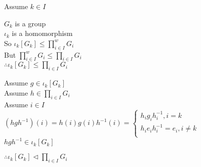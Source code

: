 \documentclass[letterpaper,12pt,fleqn]{article}
\newcommand{\direct}{\prod_{i\in I}G_i}
\newcommand{\iweak}{\prod_{i\in I}^wG_i}
\renewcommand{\i}{\iota}
\newcommand{\n}{\triangleleft}
\begin{document}
\begin{theproof}
  Assume $k\in I$
  
  $G_k$ is a group \\
  $\i_k$ is a homomorphism \\
  So $\i_k[G_k]\le\iweak$ \\
  But $\iweak\le\direct$ \\
  $\therefore\i_k[G_k]\le\direct$

  Assume $g\in\i_k[G_k]$ \\
  Assume $h\in\direct$ \\
  Assume $i\in I$ \\
  $(hgh^{-1})(i)=h(i)g(i)h^{-1}(i)=\begin{cases}
  h_ig_ih_i^{-1}, i=k \\
  h_ie_ih_i^{-1}=e_i, i\ne k \\
  \end{cases}$ \\
  $hgh^{-1}\in\i_k[G_k]$
  
  $\therefore\i_k[G_k]\n\direct$
\end{theproof}
\end{document}
